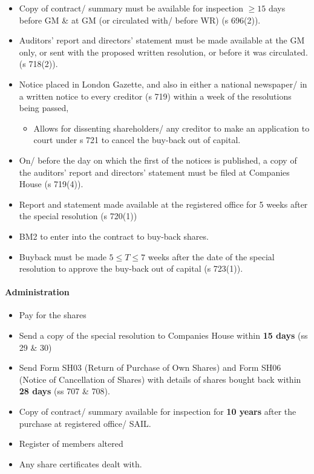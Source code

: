 \documentclass[
]{article}
\providecommand{\tightlist}{%
  \setlength{\itemsep}{0pt}\setlength{\parskip}{0pt}}
\begin{document}
\begin{itemize}
\tightlist
\item
  Copy of contract/ summary must be available for inspection \(\geq 15\)
  days before GM \& at GM (or circulated with/ before WR) (s 696(2)).
\item
  Auditors' report and directors' statement must be made available at
  the GM only, or sent with the proposed written resolution, or before
  it was circulated. (s 718(2)).
\item
  Notice placed in London Gazette, and also in either a national
  newspaper/ in a written notice to every creditor (s 719) within a week
  of the resolutions being passed,

  \begin{itemize}
  \tightlist
  \item
    Allows for dissenting shareholders/ any creditor to make an
    application to court under s 721 to cancel the buy-back out of
    capital.
  \end{itemize}
\item
  On/ before the day on which the first of the notices is published, a
  copy of the auditors' report and directors' statement must be filed at
  Companies House (s 719(4)).
\item
  Report and statement made available at the registered office for 5
  weeks after the special resolution (s 720(1))
\item
  BM2 to enter into the contract to buy-back shares.
\item
  Buyback must be made \(5 \leq T \leq 7\) weeks after the date of the
  special resolution to approve the buy-back out of capital (s 723(1)).
\end{itemize}

\hypertarget{administration-1}{%
\paragraph{Administration}\label{administration-1}}

\begin{itemize}
\tightlist
\item
  Pay for the shares
\item
  Send a copy of the special resolution to Companies House within
  \textbf{15 days} (ss 29 \& 30)
\item
  Send Form SH03 (Return of Purchase of Own Shares) and Form SH06
  (Notice of Cancellation of Shares) with details of shares bought back
  within \textbf{28 days} (ss 707 \& 708).
\item
  Copy of contract/ summary available for inspection for \textbf{10
  years} after the purchase at registered office/ SAIL.
\item
  Register of members altered
\item
  Any share certificates dealt with.
\end{itemize}
\end{document}
